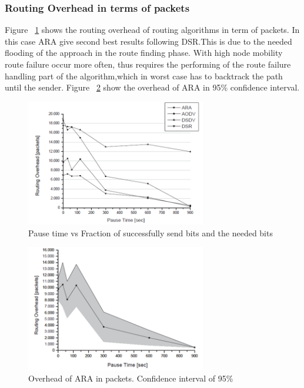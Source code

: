 \subsubsection{Routing Overhead in terms of packets}
Figure ~\ref{fig:picture5} shows the routing overhead of routing algorithms in term of packets. In this case ARA give second best results following DSR.This is due to the needed flooding of the approach in the route finding phase. With high node mobility route failure occur more often, thus requires the
performing of the route failure handling part of the algorithm,which in worst case has to backtrack the path until
the sender. Figure ~\ref{fig:picture6} show the overhead of ARA in 95\% confidence interval.
  
\begin{figure}[t!]
\centering
\includegraphics[width=0.7\textwidth]{Picture5.png}
\caption{\label{fig:picture5}Pause time vs Fraction of successfully send bits and the needed bits}
\end{figure}

\begin{figure}[t!]
\centering
\includegraphics[width=0.7\textwidth]{Picture6.png}
\caption{\label{fig:picture6}Overhead of ARA in packets. Confidence interval of 95\%}
\end{figure}


